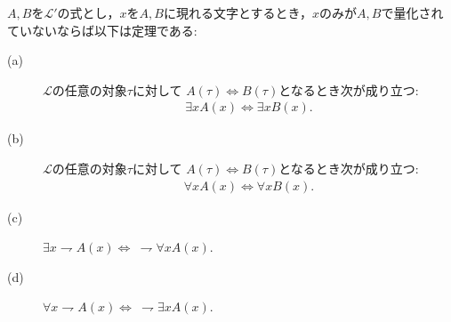 	
	\begin{screen}
		\begin{metathm}[量化記号の性質(イ)]\label{metathm:properties_of_quantifiers}
			$A,B$を$\mathcal{L}'$の式とし，$x$を$A,B$に現れる文字とするとき，$x$のみが$A,B$で量化されていないならば以下は定理である:
			\begin{description}
				\item[(a)] $\mathcal{L}$の任意の対象$\tau$に対して
					$A(\tau) \Longleftrightarrow B(\tau)$となるとき次が成り立つ:
					\begin{align}
						\exists x A(x) \Longleftrightarrow \exists x B(x).
					\end{align}
				
				\item[(b)] $\mathcal{L}$の任意の対象$\tau$に対して
					$A(\tau) \Longleftrightarrow B(\tau)$となるとき次が成り立つ:
					\begin{align}
						\forall x A(x) \Longleftrightarrow \forall x B(x).
					\end{align}
					
				\item[(c)] $\exists x \rightharpoondown A(x) \Longleftrightarrow\ \rightharpoondown \forall x A(x)$.
				
				\item[(d)] $\forall x \rightharpoondown A(x) \Longleftrightarrow\ \rightharpoondown \exists x A(x)$.
			\end{description}
		\end{metathm}
	\end{screen}
	
